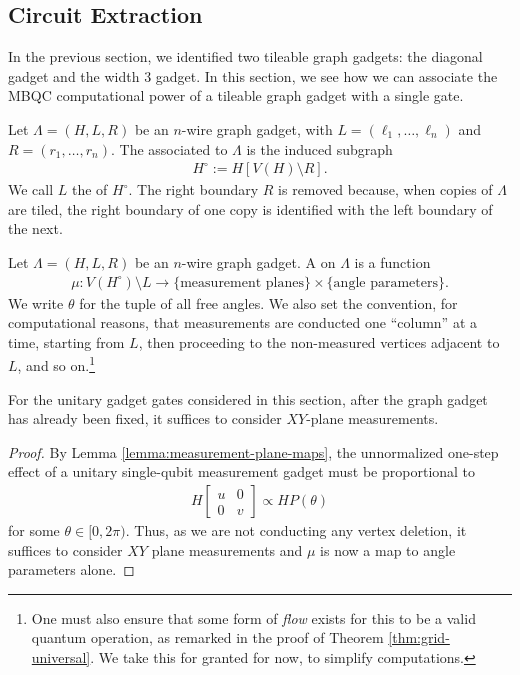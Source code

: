 \subsection{Circuit Extraction}
\label{sec:circuit-extraction}

In the previous section, we identified two tileable graph gadgets: the
diagonal gadget and the width $3$ gadget. In this section, we see how we can associate the 
MBQC computational power of a tileable graph gadget with a single gate. 

\begin{definition}
\label{def:open-tile}
Let $\Lambda=(H,L,R)$ be an $n$-wire graph gadget, with
$L=(\ell_1,\ldots,\ell_n)$ and $R=(r_1,\ldots,r_n)$. The 
associated to $\Lambda$ is the induced subgraph
\begin{align}
    H^\circ
    :=
    H[V(H)\setminus R].
\end{align}
We call $L$ the  of $H^\circ$. The right boundary $R$ is
removed because, when copies of $\Lambda$ are tiled, the right boundary of one
copy is identified with the left boundary of the next.
\end{definition}

\begin{definition}
\label{def:measurement-data-on-tile}
Let $\Lambda=(H,L,R)$ be an $n$-wire graph gadget. A 
on $\Lambda$ is a function
\begin{align}
    \mu:
    V(H^\circ)\setminus L
    \to
    \{\text{measurement planes}\}\times \{\text{angle parameters}\}.
\end{align}
We write $\theta$ for the tuple of all free angles. We also set the convention, for computational reasons, that measurements are conducted one ``column'' at a time, starting from $L$, then proceeding to the non-measured vertices adjacent to $L$, and so on.\footnote{One must also ensure that some form of \emph{flow} exists for this to be a valid quantum operation, as remarked in the proof of Theorem \ref{thm:grid-universal}. We take this for granted for now, to simplify computations.}
\end{definition}

\begin{lemma}
For the unitary gadget gates considered in this section, after the graph gadget
has already been fixed, it suffices to consider \(XY\)-plane measurements.
\end{lemma}

\begin{proof}
By Lemma \ref{lemma:measurement-plane-maps}, the unnormalized one-step effect of a unitary single-qubit measurement gadget
must be proportional to 
\begin{align}
    H \begin{bmatrix}
        u & 0 \\
        0 & v
    \end{bmatrix} \propto
    H P(\theta)
\end{align}
for some $\theta \in [0,2\pi)$. Thus, as we are not conducting any vertex deletion, it suffices to consider $XY$ plane measurements and $\mu$ is now a map to angle parameters alone.
\end{proof}

